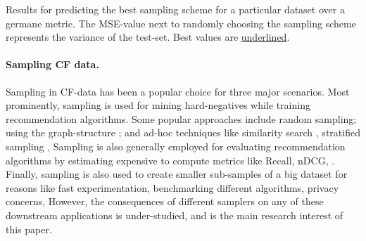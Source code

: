     \vspace{0.5cm}
    \caption{Results for predicting the best sampling scheme for a particular dataset over a germane metric. The MSE-value next to randomly choosing the sampling scheme represents the variance of the test-set. Best values are \underline{underlined}.}
    \label{oracle_results}
    \vspace{-6mm} %
\newcommand{\dataset}[0]{$\mathcal{D}$\xspace}
\newcommand{\sampled}[0]{$\mathcal{D}'$\xspace}
\newcommand{\argmin}[1]{\underset{#1}{\operatorname{arg}\,\operatorname{min}}\;}

\newcommand{\oracle}{\textsc{Data-genie}\xspace}
\newcommand{\sampler}{\textsc{SVP-CF}\xspace}
\newcommand{\samplerprop}{\textsc{SVP-CF-Prop}\xspace}

\newcommand{\EE}{\operatornamewithlimits{\mathbb{E}}} %
\paragraph{Sampling CF data.} Sampling in CF-data has been a popular choice for three major scenarios. Most prominently, sampling is used for mining hard-negatives while training recommendation algorithms. Some popular approaches include random sampling; using the graph-structure %
\cite{pinsage, eclare}; and ad-hoc techniques like similarity search \cite{slice}, stratified sampling \cite{sampling_cf_nn}, \etc %
Sampling is also generally employed for evaluating recommendation algorithms by estimating expensive to compute metrics like Recall, nDCG, \etc \cite{sampled_metrics, castells_sampling}. Finally, sampling is also used to create smaller sub-samples of 
a big dataset
for reasons like fast experimentation, benchmarking different algorithms, privacy concerns, \etc However, the consequences of different samplers on any of these downstream applications is under-studied, and is the main research interest of this paper. 

